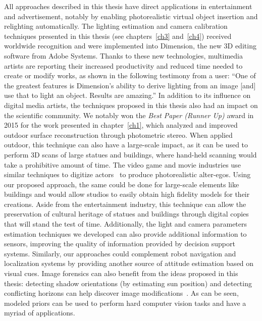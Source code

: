 All approaches described in this thesis have direct applications in entertainment and advertisement, notably by enabling photorealistic virtual object insertion and relighting automatically. The lighting estimation and camera calibration techniques presented in this thesis (see chapters~\ref{ch3} and~\ref{ch4}) received worldwide recognition and were implemented into Dimension, the new 3D editing software from Adobe Systems. Thanks to these new technologies, multimedia artists are reporting their increased productivity and reduced time needed to create or modify works, as shown in the following testimony from a user: ``One of the greatest features is Dimension's ability to derive lighting from an image [and] use that to light an object. Results are amazing.'' In addition to its influence on digital media artists, the techniques proposed in this thesis also had an impact on the scientific community. We notably won the \emph{Best Paper (Runner Up)} award in 2015 for the work presented in chapter~\ref{ch1}, which analyzed and improved outdoor surface reconstruction through photometric stereo. When applied outdoor, this technique can also have a large-scale impact, as it can be used to perform 3D scans of large statues and buildings, where hand-held scanning would take a prohibitive amount of time. The video game and movie industries use similar techniques to digitize actors~\cite{debevec2000acquiring} to produce photorealistic alter-egos. Using our proposed approach, the same could be done for large-scale elements like buildings and would allow studios to easily obtain high fidelity models for their creations. Aside from the entertainment industry, this technique can allow the preservation of cultural heritage of statues and buildings through digital copies that will stand the test of time. Additionally, the light and camera parameters estimation techniques we developed can also provide additional information to sensors, improving the quality of information provided by decision support systems. Similarly, our approaches could complement robot navigation and localization systems by providing another source of attitude estimation based on visual cues. Image forensics can also benefit from the ideas proposed in this thesis: detecting shadow orientations (by estimating sun position) and detecting conflicting horizons can help discover image modifications~\cite{Farid2010}. As can be seen, modeled priors can be used to perform hard computer vision tasks and have a myriad of applications.

